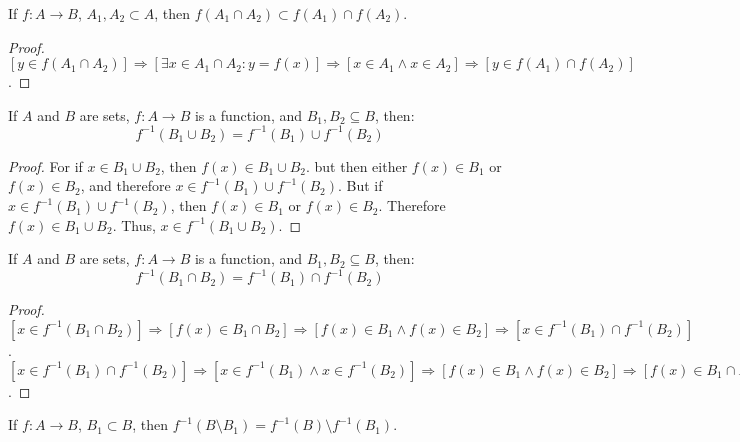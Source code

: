         \begin{theorem}
        If $f:A\rightarrow B$, $A_1,A_2\subset A$, then $f(A_1\cap A_2)\subset f(A_1)\cap f(A_2)$.
        \end{theorem}
        \begin{proof}
        $[y\in f(A_1 \cap A_2)]\Rightarrow [\exists x\in A_1 \cap A_2:y=f(x)]\Rightarrow [x\in A_1 \land x \in A_2] \Rightarrow[y \in f(A_1)\cap f(A_2)]$.
        \end{proof}
        \begin{theorem}
            If $A$ and $B$ are sets, $f:A\rightarrow{B}$ is a function,
            and $B_{1},B_{2}\subseteq{B}$, then:
            \begin{equation}
                f^{-1}(B_{1}\cup{B}_{2})=f^{-1}(B_{1})\cup{f}^{-1}(B_{2})
            \end{equation}
        \end{theorem}
        \begin{proof}
            For if $x\in{B}_{1}\cup{B}_{2}$, then
            $f(x)\in{B}_{1}\cup{B}_{2}$. but then either
            $f(x)\in{B}_{1}$ or $f(x)\in{B}_{2}$, and therefore
            $x\in{f}^{\minus{1}}(B_1)\cup{f}^{\minus{1}}(B_2)$. But if
            $x\in{f}^{\minus{1}}(B_{1})\cup{f}^{\minus{1}}(B_2)$, then
            $f(x)\in{B}_{1}$ or $f(x)\in{B}_{2}$. Therefore
            $f(x)\in{B}_{1}\cup{B}_{2}$. Thus, $x\in{f}^{-1}(B_1\cup{B}_2)$.
        \end{proof}
        \begin{theorem}
            If $A$ and $B$ are sets, $f:A\rightarrow{B}$ is a function,
            and $B_{1},B_{2}\subseteq{B}$, then:
            \begin{equation}
                f^{-1}(B_{1}\cap{B}_{2})=f^{-1}(B_{1})\cap{f}^{-1}(B_{2})
            \end{equation}
        \end{theorem}
        \begin{proof}
            $[x\in f^{-1}(B_1\cap B_2)]\Rightarrow [f(x) \in B_1 \cap B_2]\Rightarrow [f(x)\in B_1\land f(x) \in B_2 ]\Rightarrow [x\in f^{-1}(B_1)\cap f^{-1}(B_2)]$. $[x\in f^{-1}(B_1)\cap f^{-1}(B_2)]\Rightarrow [x\in f^{-1}(B_1)\land x\in f^{-1}(B_2)]\Rightarrow [f(x) \in B_1\land f(x) \in B_2]\Rightarrow [f(x)\in B_1\cap B_2]\Rightarrow [x\in f^{-1}(B_1\cap B_2)]$.
        \end{proof}
        \begin{theorem}
        If $f:A\rightarrow B$, $B_1 \subset B$, then $f^{-1}(B\setminus B_1) = f^{-1}(B)\setminus f^{-1}(B_1)$.
        \end{theorem}
